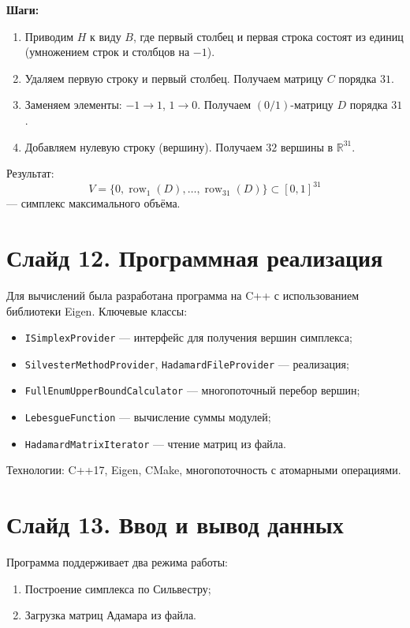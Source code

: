 \documentclass[a4paper,12pt]{article}
\begin{document}
\textbf{Шаги:}
\begin{enumerate}
    \item Приводим $H$ к виду $B$, где первый столбец и первая строка состоят из единиц (умножением строк и столбцов на $-1$).
    \item Удаляем первую строку и первый столбец. Получаем матрицу $C$ порядка $31$.
    \item Заменяем элементы: $-1 \to 1$, $1 \to 0$. Получаем $(0/1)$-матрицу $D$ порядка $31$.
    \item Добавляем нулевую строку (вершину). Получаем $32$ вершины в $\mathbb{R}^{31}$.
\end{enumerate}

Результат:
\[
V = \{0, \operatorname{row}_1(D), \dots, \operatorname{row}_{31}(D)\} \subset [0,1]^{31}
\]
— симплекс максимального объёма.

\section*{Слайд 12. Программная реализация}

Для вычислений была разработана программа на C++ с использованием библиотеки Eigen. Ключевые классы:
\begin{itemize}
    \item \texttt{ISimplexProvider} — интерфейс для получения вершин симплекса;
    \item \texttt{SilvesterMethodProvider}, \texttt{HadamardFileProvider} — реализация;
    \item \texttt{FullEnumUpperBoundCalculator} — многопоточный перебор вершин;
    \item \texttt{LebesgueFunction} — вычисление суммы модулей;
    \item \texttt{HadamardMatrixIterator} — чтение матриц из файла.
\end{itemize}

Технологии: C++17, Eigen, CMake, многопоточность с атомарными операциями.

\section*{Слайд 13. Ввод и вывод данных}

Программа поддерживает два режима работы:
\begin{enumerate}
    \item Построение симплекса по Сильвестру;
    \item Загрузка матриц Адамара из файла.
\end{enumerate}
\end{document}
